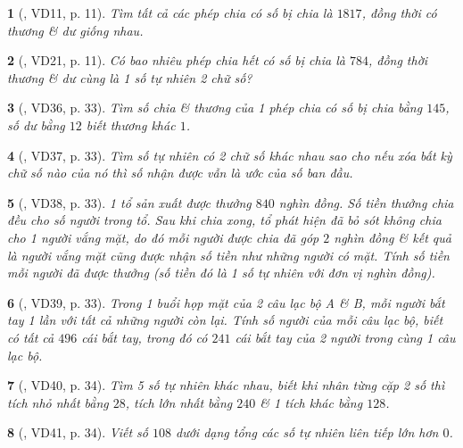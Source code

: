 \documentclass{article}
\newtheorem{baitoan}{}
\begin{document}
\begin{baitoan}[\cite{Huy_so_hoc}, VD11, p. 11]
	Tìm tất cả các phép chia có số bị chia là $1817$, đồng thời có thương \& dư giống nhau.
\end{baitoan}

\begin{baitoan}[\cite{Huy_so_hoc}, VD21, p. 11]
	Có bao nhiêu phép chia hết có số bị chia là $784$, đồng thời thương \& dư cùng là 1 số tự nhiên 2 chữ số?
\end{baitoan}

\begin{baitoan}[\cite{Binh_Toan_6_tap_1}, VD36, p. 33]
	Tìm số chia \& thương của 1 phép chia có số bị chia bằng $145$, số dư bằng $12$ biết thương khác $1$.
\end{baitoan}

\begin{baitoan}[\cite{Binh_Toan_6_tap_1}, VD37, p. 33]
	Tìm số tự nhiên có 2 chữ số khác nhau sao cho nếu xóa bất kỳ chữ số nào của nó thì số nhận được vẫn là ước của số ban đầu.
\end{baitoan}

\begin{baitoan}[\cite{Binh_Toan_6_tap_1}, VD38, p. 33]
	1 tổ sản xuất được thưởng $840$ nghìn đồng. Số tiền thưởng chia đều cho số người trong tổ. Sau khi chia xong, tổ phát hiện đã bỏ sót không chia cho 1 người vắng mặt, do đó mỗi người được chia đã góp $2$ nghìn đồng \& kết quả là người vắng mặt cũng được nhận số tiền như những người có mặt. Tính số tiền mỗi người đã được thưởng (số tiền đó là 1 số tự nhiên với đơn vị nghìn đồng).
\end{baitoan}

\begin{baitoan}[\cite{Binh_Toan_6_tap_1}, VD39, p. 33]
	Trong 1 buổi họp mặt của 2 câu lạc bộ A \& B, mỗi người bắt tay 1 lần với tất cả những người còn lại. Tính số người của mỗi câu lạc bộ, biết có tất cả $496$ cái bắt tay, trong đó có $241$ cái bắt tay của 2 người trong cùng 1 câu lạc bộ.
\end{baitoan}

\begin{baitoan}[\cite{Binh_Toan_6_tap_1}, VD40, p. 34]
	Tìm 5 số tự nhiên khác nhau, biết khi nhân từng cặp 2 số thì tích nhỏ nhất bằng $28$, tích lớn nhất bằng $240$ \& 1 tích khác bằng $128$.
\end{baitoan}

\begin{baitoan}[\cite{Binh_Toan_6_tap_1}, VD41, p. 34]
	Viết số $108$ dưới dạng tổng các số tự nhiên liên tiếp lớn hơn $0$.
\end{baitoan}
\end{document}
